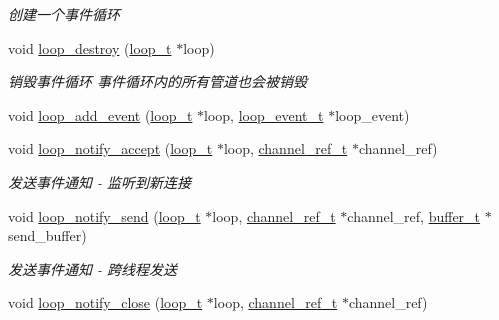 \begin{DoxyCompactItemize}
\begin{DoxyCompactList}\small\item\em 创建一个事件循环 \end{DoxyCompactList}\item 
void \hyperlink{a00085_ga921fd5e5e16a73de123e81baab187a0a_ga921fd5e5e16a73de123e81baab187a0a}{loop\+\_\+destroy} (\hyperlink{a00044_a9c3ad1cd2de83e09f3a7b59fa82c94ee_a9c3ad1cd2de83e09f3a7b59fa82c94ee}{loop\+\_\+t} $\ast$loop)
\begin{DoxyCompactList}\small\item\em 销毁事件循环 事件循环内的所有管道也会被销毁 \end{DoxyCompactList}\item 
void \hyperlink{a00052_a1697e4a52238e6e4512caac6c34b9abb_a1697e4a52238e6e4512caac6c34b9abb}{loop\+\_\+add\+\_\+event} (\hyperlink{a00044_a9c3ad1cd2de83e09f3a7b59fa82c94ee_a9c3ad1cd2de83e09f3a7b59fa82c94ee}{loop\+\_\+t} $\ast$loop, \hyperlink{a00052_a1095ee772017ce29dcac0987c456709e_a1095ee772017ce29dcac0987c456709e}{loop\+\_\+event\+\_\+t} $\ast$loop\+\_\+event)
\item 
void \hyperlink{a00052_a61e9eb6eeaaad4d1d655beba05bb8440_a61e9eb6eeaaad4d1d655beba05bb8440}{loop\+\_\+notify\+\_\+accept} (\hyperlink{a00044_a9c3ad1cd2de83e09f3a7b59fa82c94ee_a9c3ad1cd2de83e09f3a7b59fa82c94ee}{loop\+\_\+t} $\ast$loop, \hyperlink{a00044_a151271c9d188ef28d4d24bb81dcc1263_a151271c9d188ef28d4d24bb81dcc1263}{channel\+\_\+ref\+\_\+t} $\ast$channel\+\_\+ref)
\begin{DoxyCompactList}\small\item\em 发送事件通知 -\/ 监听到新连接 \end{DoxyCompactList}\item 
void \hyperlink{a00052_ad023112870f736a601137129420a94b9_ad023112870f736a601137129420a94b9}{loop\+\_\+notify\+\_\+send} (\hyperlink{a00044_a9c3ad1cd2de83e09f3a7b59fa82c94ee_a9c3ad1cd2de83e09f3a7b59fa82c94ee}{loop\+\_\+t} $\ast$loop, \hyperlink{a00044_a151271c9d188ef28d4d24bb81dcc1263_a151271c9d188ef28d4d24bb81dcc1263}{channel\+\_\+ref\+\_\+t} $\ast$channel\+\_\+ref, \hyperlink{a00044_aad99a77d28bd81d3d36d0ea569c9482d_aad99a77d28bd81d3d36d0ea569c9482d}{buffer\+\_\+t} $\ast$send\+\_\+buffer)
\begin{DoxyCompactList}\small\item\em 发送事件通知 -\/ 跨线程发送 \end{DoxyCompactList}\item 
void \hyperlink{a00052_a6c9f3ec8e93c6e7b10ebb4dcaca562d4_a6c9f3ec8e93c6e7b10ebb4dcaca562d4}{loop\+\_\+notify\+\_\+close} (\hyperlink{a00044_a9c3ad1cd2de83e09f3a7b59fa82c94ee_a9c3ad1cd2de83e09f3a7b59fa82c94ee}{loop\+\_\+t} $\ast$loop, \hyperlink{a00044_a151271c9d188ef28d4d24bb81dcc1263_a151271c9d188ef28d4d24bb81dcc1263}{channel\+\_\+ref\+\_\+t} $\ast$channel\+\_\+ref)

\end{DoxyCompactItemize}
